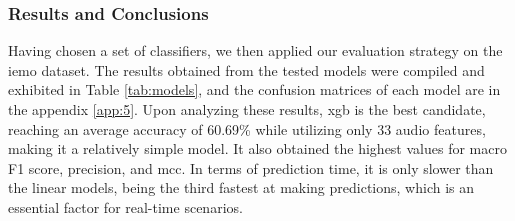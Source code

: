 \subsubsection{Results and Conclusions}

Having chosen a set of classifiers, we then applied our evaluation strategy on the \ac{iemo} dataset. The results obtained from the tested models were compiled and exhibited in Table \ref{tab:models}, and the confusion matrices of each model are in the appendix \ref{app:5}. Upon analyzing these results, \ac{xgb} is the best candidate, reaching an average accuracy of 60.69\% while utilizing only 33 audio features, making it a relatively simple model. It also obtained the highest values for macro F1 score, precision, and \ac{mcc}. In terms of prediction time, it is only slower than the linear models, being the third fastest at making predictions, which is an essential factor for real-time scenarios.

\begin{table}[H]
	\centering
	\caption{Tested models' 5-fold stratified \ac{cv} performance on \ac{iemo}.}
	\label{tab:models}
\end{table}

